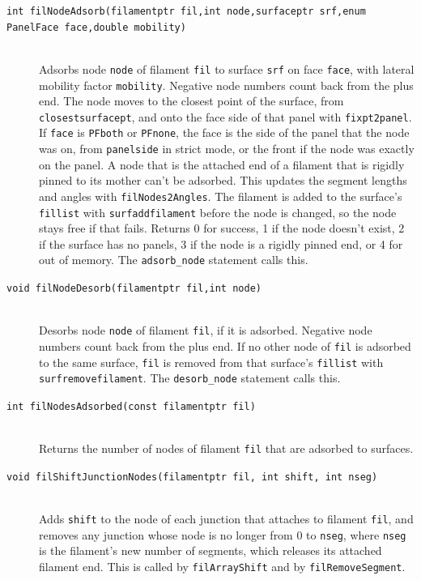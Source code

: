 \documentclass {scrbook}
\newcommand {\ttt} {\texttt}
\begin{document}
\begin{description}
\item[\ttt{int filNodeAdsorb(filamentptr fil,int node,surfaceptr srf,enum PanelFace face,double mobility)}] %
\hfill \\
Adsorbs node \ttt{node} of filament \ttt{fil} to surface \ttt{srf} on face \ttt{face}, with lateral mobility factor \ttt{mobility}. Negative node numbers count back from the plus end. The node moves to the closest point of the surface, from \ttt{closestsurfacept}, and onto the face side of that panel with \ttt{fixpt2panel}. If \ttt{face} is \ttt{PFboth} or \ttt{PFnone}, the face is the side of the panel that the node was on, from \ttt{panelside} in strict mode, or the front if the node was exactly on the panel. A node that is the attached end of a filament that is rigidly pinned to its mother can't be adsorbed. This updates the segment lengths and angles with \ttt{filNodes2Angles}. The filament is added to the surface's \ttt{fillist} with \ttt{surfaddfilament} before the node is changed, so the node stays free if that fails. Returns 0 for success, 1 if the node doesn't exist, 2 if the surface has no panels, 3 if the node is a rigidly pinned end, or 4 for out of memory. The \ttt{adsorb\_node} statement calls this.

\item[\ttt{void filNodeDesorb(filamentptr fil,int node)}] %
\hfill \\
Desorbs node \ttt{node} of filament \ttt{fil}, if it is adsorbed. Negative node numbers count back from the plus end. If no other node of \ttt{fil} is adsorbed to the same surface, \ttt{fil} is removed from that surface's \ttt{fillist} with \ttt{surfremovefilament}. The \ttt{desorb\_node} statement calls this.

\item[\ttt{int filNodesAdsorbed(const filamentptr fil)}] %
\hfill \\
Returns the number of nodes of filament \ttt{fil} that are adsorbed to surfaces.

\item[\ttt{void filShiftJunctionNodes(filamentptr fil, int shift, int nseg)}]
\hfill \\
Adds \ttt{shift} to the node of each junction that attaches to filament \ttt{fil}, and removes any junction whose node is no longer from 0 to \ttt{nseg}, where \ttt{nseg} is the filament's new number of segments, which releases its attached filament end. This is called by \ttt{filArrayShift} and by \ttt{filRemoveSegment}.


\end{description}
\end{document}
